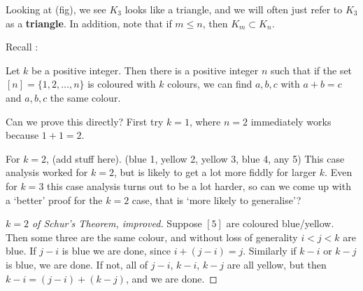 \documentclass{article}
\begin{document}
\begin{center}
\end{center}

Looking at (fig), we see $K_3$ looks like a triangle, and we will often just refer to $K_3$ as a \textbf{triangle}\label{def:triangle}.  In addition, note that if $m \leq n$, then $K_m \subset K_n$.

Recall :
\begin{thm}
    Let $k$ be a positive integer. Then there is a positive integer $n$ such that if the set $[n] = \{1, 2, \dots, n\}$ is coloured with $k$ colours, we can find $a, b, c$ with $a + b = c$ and $a,b,c$ the same colour.
\end{thm}

Can we prove this directly? First try $k=1$, where $n=2$ immediately works because $1+1=2$.

For $k=2$, (add stuff here). (blue 1, yellow 2, yellow 3, blue 4, any 5)
This case analysis worked for $k=2$, but is likely to get a lot more fiddly for larger $k$. Even for $k=3$ this case analysis turns out to be a lot harder, so can we come up with a `better' proof for the $k=2$ case, that is `more likely to generalise'?

\begin{proof}[$k=2$ of Schur's Theorem, improved]
    Suppose $[5]$ are coloured blue/yellow.  Then some three are the same colour, and without loss of generality $i < j < k$ are blue. If $j-i$ is blue we are done, since $i + (j-i) = j$.
    Similarly if $k-i$ or $k-j$ is blue, we are done.  If not, all of $j-i$, $k-i$, $k-j$ are all yellow, but then $k-i = (j-i) + (k-j)$, and we are done.
\end{proof}
\end{document}

